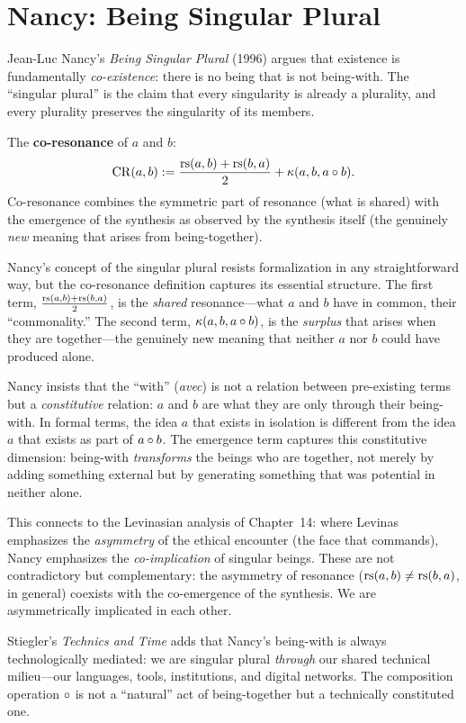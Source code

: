 \section{Nancy: Being Singular Plural}

Jean-Luc Nancy's \textit{Being Singular Plural} (1996) argues that existence
is fundamentally \emph{co-existence}: there is no being that is not
being-with. The ``singular plural'' is the claim that every singularity is
already a plurality, and every plurality preserves the singularity of its
members.

\begin{definition}[Co-Resonance]
\label{def:co-resonance}
The \textbf{co-resonance} of $a$ and $b$:
\[
\mathrm{CR}(a, b) := \frac{\mathrm{rs}(a, b) + \mathrm{rs}(b, a)}{2} + \kappa(a, b, a \circ b).
\]
Co-resonance combines the symmetric part of resonance (what is shared) with
the emergence of the synthesis as observed by the synthesis itself (the genuinely
\emph{new} meaning that arises from being-together).
\end{definition}

\begin{interpretation}
Nancy's concept of the singular plural resists formalization in any
straightforward way, but the co-resonance definition captures its essential
structure. The first term, $\frac{\mathrm{rs}(a,b) + \mathrm{rs}(b,a)}{2}$, is the
\emph{shared} resonance---what $a$ and $b$ have in common, their
``commonality.'' The second term, $\kappa(a, b, a \circ b)$, is the
\emph{surplus} that arises when they are together---the genuinely new meaning
that neither $a$ nor $b$ could have produced alone.

Nancy insists that the ``with'' (\textit{avec}) is not a relation between
pre-existing terms but a \emph{constitutive} relation: $a$ and $b$ are what
they are only through their being-with. In formal terms, the idea $a$ that
exists in isolation is different from the idea $a$ that exists as part of
$a \circ b$. The emergence term captures this constitutive dimension:
being-with \emph{transforms} the beings who are together, not merely by
adding something external but by generating something that was potential
in neither alone.

This connects to the Levinasian analysis of Chapter~14: where Levinas
emphasizes the \emph{asymmetry} of the ethical encounter (the face that
commands), Nancy emphasizes the \emph{co-implication} of singular beings.
These are not contradictory but complementary: the asymmetry of resonance
($\mathrm{rs}(a,b) \neq \mathrm{rs}(b,a)$, in general) coexists with the co-emergence of
the synthesis. We are asymmetrically implicated in each other.

Stiegler's \textit{Technics and Time} adds that Nancy's being-with is always
technologically mediated: we are singular plural \emph{through} our shared
technical milieu---our languages, tools, institutions, and digital networks.
The composition operation $\circ$ is not a ``natural'' act of being-together
but a technically constituted one.
\end{interpretation}

